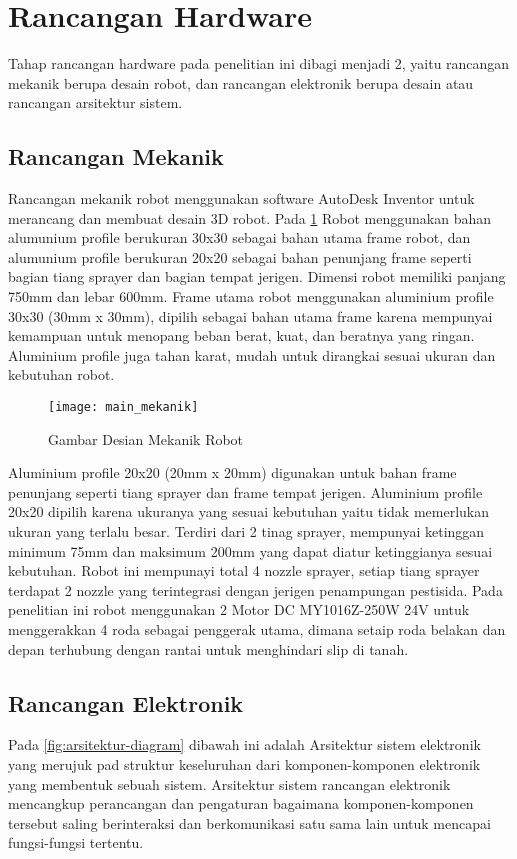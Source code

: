 \section{Rancangan Hardware}
Tahap rancangan hardware pada penelitian ini dibagi menjadi 2, yaitu rancangan mekanik berupa desain robot, dan rancangan elektronik berupa desain atau rancangan arsitektur sistem.

\subsection{Rancangan Mekanik}
Rancangan mekanik robot menggunakan software AutoDesk Inventor untuk merancang dan membuat desain 3D robot. Pada \cref{fig:mekanik-utama} Robot menggunakan bahan alumunium profile berukuran 30x30  sebagai bahan utama frame robot, dan alumunium profile berukuran 20x20 sebagai bahan penunjang frame seperti bagian tiang sprayer dan bagian tempat jerigen. Dimensi robot memiliki panjang 750mm dan lebar 600mm. Frame utama robot menggunakan aluminium profile 30x30 (30mm x 30mm), dipilih sebagai bahan utama frame karena mempunyai kemampuan untuk menopang beban berat, kuat, dan beratnya yang ringan. Aluminium profile juga tahan karat, mudah untuk dirangkai sesuai ukuran dan kebutuhan robot.

\begin{figure}[H]
	\centering
	\texttt{[image: main\_mekanik]}
	\caption{Gambar Desian Mekanik Robot}
	\label{fig:mekanik-utama}
\end{figure}

Aluminium profile 20x20 (20mm x 20mm) digunakan untuk bahan frame penunjang seperti tiang sprayer dan frame tempat jerigen. Aluminium profile 20x20 dipilih karena ukuranya yang sesuai kebutuhan yaitu tidak memerlukan ukuran yang terlalu besar. Terdiri dari 2 tinag sprayer, mempunyai ketinggan minimum 75mm dan maksimum 200mm yang dapat diatur ketinggianya sesuai kebutuhan. Robot ini mempunayi total 4 nozzle sprayer,  setiap tiang sprayer terdapat 2 nozzle yang terintegrasi dengan jerigen penampungan pestisida. Pada penelitian ini robot menggunakan 2 Motor DC MY1016Z-250W 24V untuk menggerakkan 4 roda sebagai penggerak utama, dimana setaip roda belakan dan depan terhubung dengan rantai untuk menghindari slip di tanah.

\subsection{Rancangan Elektronik}
Pada \cref{fig:arsitektur-diagram} dibawah ini adalah Arsitektur sistem elektronik yang merujuk pad struktur keseluruhan dari komponen-komponen elektronik yang membentuk sebuah sistem. Arsitektur sistem rancangan elektronik mencangkup perancangan dan pengaturan bagaimana komponen-komponen tersebut saling berinteraksi dan berkomunikasi satu sama lain untuk mencapai fungsi-fungsi tertentu. 

